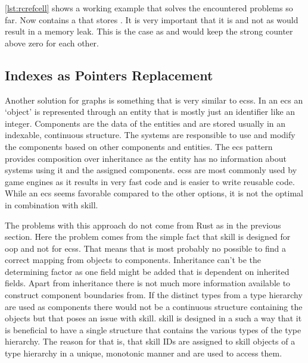 \documentclass[thesis]{subfiles}
\begin{document}
    

    \autoref{lst:rcrefcell} shows a working example that solves the encountered problems so far.
    Now \Node contains a  that stores \WeakT.
    It is very important that it is \WeakT and not \RcT as \RcT would result in a memory leak.
    This is the case as  and  would keep the strong counter above zero for each other.

  \subsection{Indexes as Pointers Replacement}
    Another solution for graphs is something that is very similar to \glspl{ecs}.
    In an \gls{ecs} an `object' is represented through an entity that is mostly just an identifier like an integer.
    Components are the data of the entities and are stored usually in an indexable, continuous structure.
    The systems are responsible to use and modify the components based on other components and entities.\autocite{sfml}
    The \gls{ecs} pattern provides composition over inheritance as the entity has no information about systems using it and the assigned components.
    \glspl{ecs} are most commonly used by game engines as it results in very fast code and is easier to write reusable code\autocite{unity}.
    While an \gls{ecs} seems favorable compared to the other options, it is not the optimal in combination with \gls{skill}.

    The problems with this approach do not come from Rust as in the previous section.
    Here the problem comes from the simple fact that \gls{skill} is designed for \gls{oop} and not for \glspl{ecs}.
    That means that is most probably no possible to find a correct mapping from objects to components.
    Inheritance can't be the determining factor as one field might be added that is dependent on inherited fields.
    Apart from inheritance there is not much more information available to construct component boundaries from.
    If the distinct types from a type hierarchy are used as components there would not be a continuous structure containing the objects but that poses an issue with \gls{skill}.
    \gls{skill} is designed in a such a way that it is beneficial to have a single structure that contains the various types of the type hierarchy.
    The reason for that is, that \gls{skill} IDs are assigned to \gls{skill} objects of a type hierarchy in a unique, monotonic manner and are used to access them.\autocite{skill-tr}
\end{document}
